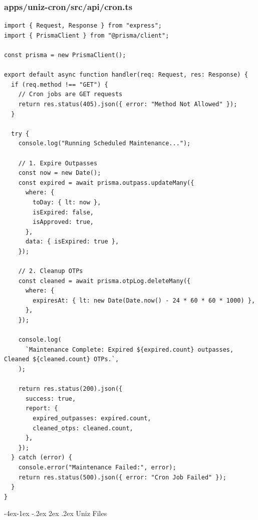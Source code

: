 \documentclass[11pt,a4paper,oneside]{article}
\makeatletter
\renewcommand{\subsection}{\@startsection{subsection}{2}{\z@}%
    {-4ex\@plus -1ex \@minus -.2ex}%
    {2ex \@plus .2ex}%
    {\normalfont\Large\bfseries\color{accent}}}
\makeatother
\begin{document}
\subsubsection*{apps/uniz-cron/src/api/cron.ts}
\begin{lstlisting}
import { Request, Response } from "express";
import { PrismaClient } from "@prisma/client";

const prisma = new PrismaClient();

export default async function handler(req: Request, res: Response) {
  if (req.method !== "GET") {
    // Cron jobs are GET requests
    return res.status(405).json({ error: "Method Not Allowed" });
  }

  try {
    console.log("Running Scheduled Maintenance...");

    // 1. Expire Outpasses
    const now = new Date();
    const expired = await prisma.outpass.updateMany({
      where: {
        toDay: { lt: now },
        isExpired: false,
        isApproved: true,
      },
      data: { isExpired: true },
    });

    // 2. Cleanup OTPs
    const cleaned = await prisma.otpLog.deleteMany({
      where: {
        expiresAt: { lt: new Date(Date.now() - 24 * 60 * 60 * 1000) },
      },
    });

    console.log(
      `Maintenance Complete: Expired ${expired.count} outpasses, Cleaned ${cleaned.count} OTPs.`,
    );

    return res.status(200).json({
      success: true,
      report: {
        expired_outpasses: expired.count,
        cleaned_otps: cleaned.count,
      },
    });
  } catch (error) {
    console.error("Maintenance Failed:", error);
    return res.status(500).json({ error: "Cron Job Failed" });
  }
}

\end{lstlisting}

\subsection{Uniz Files}
\end{document}
